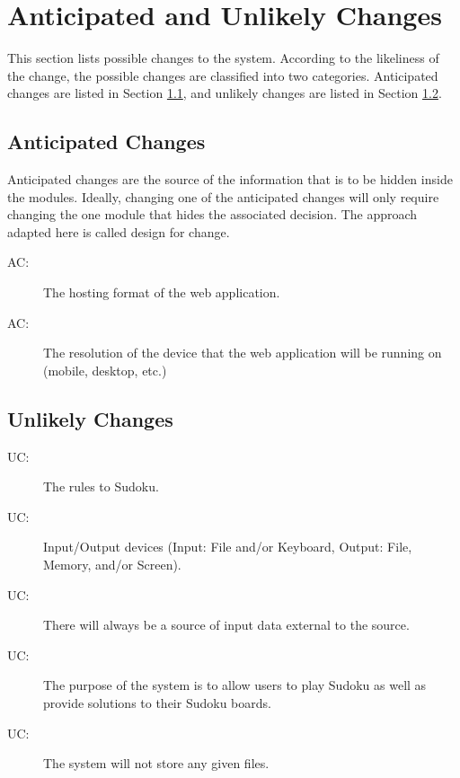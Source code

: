 \documentclass[12pt, titlepage]{article}
\newcounter{acnum}
\newcommand{\actheacnum}{AC\theacnum}
\newcounter{ucnum}
\newcommand{\uctheucnum}{UC\theucnum}
\begin{document}
\newpage

\section{Anticipated and Unlikely Changes} \label{SecChange}

This section lists possible changes to the system. According to the likeliness
of the change, the possible changes are classified into two
categories. Anticipated changes are listed in Section \ref{SecAchange}, and
unlikely changes are listed in Section \ref{SecUchange}.

\subsection{Anticipated Changes} \label{SecAchange}

Anticipated changes are the source of the information that is to be hidden
inside the modules. Ideally, changing one of the anticipated changes will only
require changing the one module that hides the associated decision. The approach
adapted here is called design for
change.

\begin{description}
\item[ \actheacnum \label{acBrowser}:] The hosting format of the web application.
\item[ \actheacnum \label{acDisplay}:] The resolution of the device that the web application will be running on (mobile, desktop, etc.)
\end{description}

\subsection{Unlikely Changes} \label{SecUchange}

\begin{description}
\item[ \uctheucnum \label{ucRules}:] The rules to Sudoku.
\item[ \uctheucnum \label{ucInput}:] Input/Output devices (Input: File and/or Keyboard, Output: File, Memory, and/or Screen).
\item[ \uctheucnum \label{ucSource}:] There will always be a source of input data external to the source.
\item[ \uctheucnum \label{ucPurpose}:] The purpose of the system is to allow users to play Sudoku as well as provide solutions to their Sudoku boards.
\item[ \uctheucnum \label{ucStorage}:] The system will not store any given files.
\end{description}
\end{document}
